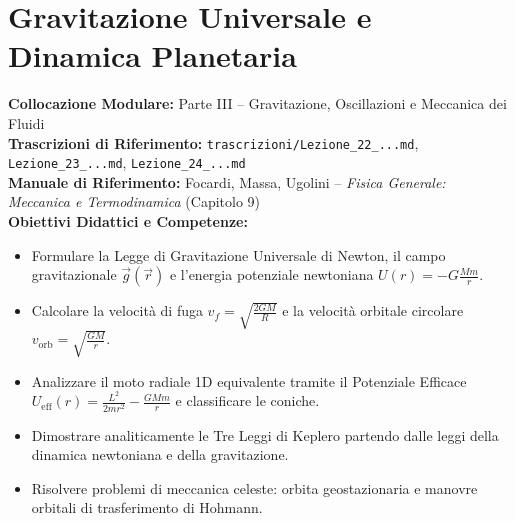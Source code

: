 \chapter{Gravitazione Universale e Dinamica Planetaria}
\label{chap:gravitazione_forze_centrali}

\begin{tcolorbox}[enhanced, breakable, colback=navyblue!4!white, colframe=navyblue!80!black,
    coltitle=white, fonttitle=\bfseries\sffamily, title={Quadro Sinottico del Capitolo 09 (Corrispondenza: Lezioni 22, 23 e 24)},
    sharp corners, rounded corners=south, boxrule=1pt]
\textbf{Collocazione Modulare:} Parte III -- Gravitazione, Oscillazioni e Meccanica dei Fluidi\\
\textbf{Trascrizioni di Riferimento:} \texttt{trascrizioni/Lezione\_22\_...md}, \texttt{Lezione\_23\_...md}, \texttt{Lezione\_24\_...md}\\
\textbf{Manuale di Riferimento:} Focardi, Massa, Ugolini -- \emph{Fisica Generale: Meccanica e Termodinamica} (Capitolo 9)\\
\textbf{Obiettivi Didattici e Competenze:}\par
\begin{itemize}
    \item Formulare la Legge di Gravitazione Universale di Newton, il campo gravitazionale $\vec{g}(\vec{r})$ e l'energia potenziale newtoniana $U(r) = -G\frac{Mm}{r}$.
    \item Calcolare la velocità di fuga $v_f = \sqrt{\frac{2GM}{R}}$ e la velocità orbitale circolare $v_{\text{orb}} = \sqrt{\frac{GM}{r}}$.
    \item Analizzare il moto radiale 1D equivalente tramite il Potenziale Efficace $U_{\text{eff}}(r) = \frac{L^2}{2mr^2} - \frac{GMm}{r}$ e classificare le coniche.
    \item Dimostrare analiticamente le Tre Leggi di Keplero partendo dalle leggi della dinamica newtoniana e della gravitazione.
    \item Risolvere problemi di meccanica celeste: orbita geostazionaria e manovre orbitali di trasferimento di Hohmann.
\end{itemize}
\end{tcolorbox}

\vspace{0.5em}

